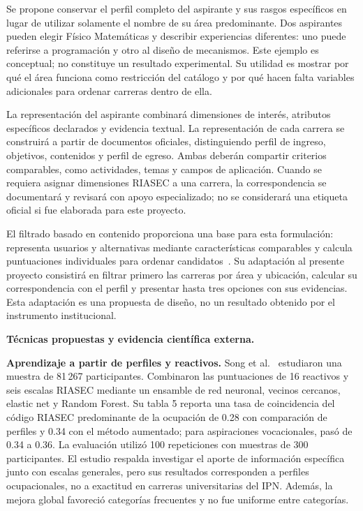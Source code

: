 Se propone conservar el perfil completo del aspirante y sus rasgos específicos en lugar de utilizar solamente el nombre de su área predominante. Dos aspirantes pueden elegir Físico Matemáticas y describir experiencias diferentes: uno puede referirse a programación y otro al diseño de mecanismos. Este ejemplo es conceptual; no constituye un resultado experimental. Su utilidad es mostrar por qué el área funciona como restricción del catálogo y por qué hacen falta variables adicionales para ordenar carreras dentro de ella.

La representación del aspirante combinará dimensiones de interés, atributos específicos declarados y evidencia textual. La representación de cada carrera se construirá a partir de documentos oficiales, distinguiendo perfil de ingreso, objetivos, contenidos y perfil de egreso. Ambas deberán compartir criterios comparables, como actividades, temas y campos de aplicación. Cuando se requiera asignar dimensiones RIASEC a una carrera, la correspondencia se documentará y revisará con apoyo especializado; no se considerará una etiqueta oficial si fue elaborada para este proyecto.

El filtrado basado en contenido proporciona una base para esta formulación: representa usuarios y alternativas mediante características comparables y calcula puntuaciones individuales para ordenar candidatos~\cite{GoogleContentBased2025}. Su adaptación al presente proyecto consistirá en filtrar primero las carreras por área y ubicación, calcular su correspondencia con el perfil y presentar hasta tres opciones con sus evidencias. Esta adaptación es una propuesta de diseño, no un resultado obtenido por el instrumento institucional.

\noindent\textbf{Técnicas propuestas y evidencia científica externa.}\par\smallskip
\label{sec:evidencia-datos}

\textbf{Aprendizaje a partir de perfiles y reactivos.} Song et al.~\cite{Song2024Career} estudiaron una muestra de 81\,267 participantes. Combinaron las puntuaciones de 16 reactivos y seis escalas RIASEC mediante un ensamble de red neuronal, vecinos cercanos, elastic net y Random Forest. Su tabla 5 reporta una tasa de coincidencia del código RIASEC predominante de la ocupación de 0.28 con comparación de perfiles y 0.34 con el método aumentado; para aspiraciones vocacionales, pasó de 0.34 a 0.36. La evaluación utilizó 100 repeticiones con muestras de 300 participantes. El estudio respalda investigar el aporte de información específica junto con escalas generales, pero sus resultados corresponden a perfiles ocupacionales, no a exactitud en carreras universitarias del IPN. Además, la mejora global favoreció categorías frecuentes y no fue uniforme entre categorías.

